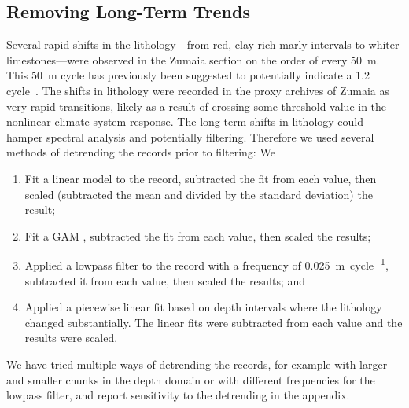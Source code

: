 \documentclass[]{agujournal2019}
\newcommand{\ijk}{\textcolor{blue}}
\begin{document}
\subsection{Removing Long-Term Trends}\label{sec:detrend}

Several rapid shifts in the lithology---from red, clay-rich marly intervals to whiter limestones---were observed in the Zumaia section on the order of every \qty{50}{\metre}.
This \qty{50}{\metre} cycle has previously been suggested to potentially indicate a \qty{1.2}{\millionyear} cycle~\cite{Batenburg2014}.
The shifts in lithology were recorded in the proxy archives of Zumaia as very rapid transitions, likely as a result of crossing some threshold value in the nonlinear climate system response.
The long-term shifts in lithology could hamper spectral analysis and potentially filtering.
Therefore we used several methods of detrending the records prior to filtering: We
\begin{enumerate}
    \item Fit a linear model to the record, subtracted the fit from each value, then scaled (subtracted the mean and divided by the standard deviation) the result;
    \item Fit a  \gls{GAM} , subtracted the fit from each value, then scaled the results;
    \item Applied a lowpass filter to the record with a frequency of \qty{0.025}{\metre\per cycle}, subtracted it from each value, then scaled the results;
and
    \item Applied a piecewise linear fit based on depth intervals where the lithology changed substantially.
    The linear fits were subtracted from each value and the results were scaled.
\end{enumerate}

We have tried multiple ways of detrending the records, for example with larger and smaller chunks in the depth domain or with different frequencies for the lowpass filter, and report sensitivity to the detrending in the appendix.
\end{document}
